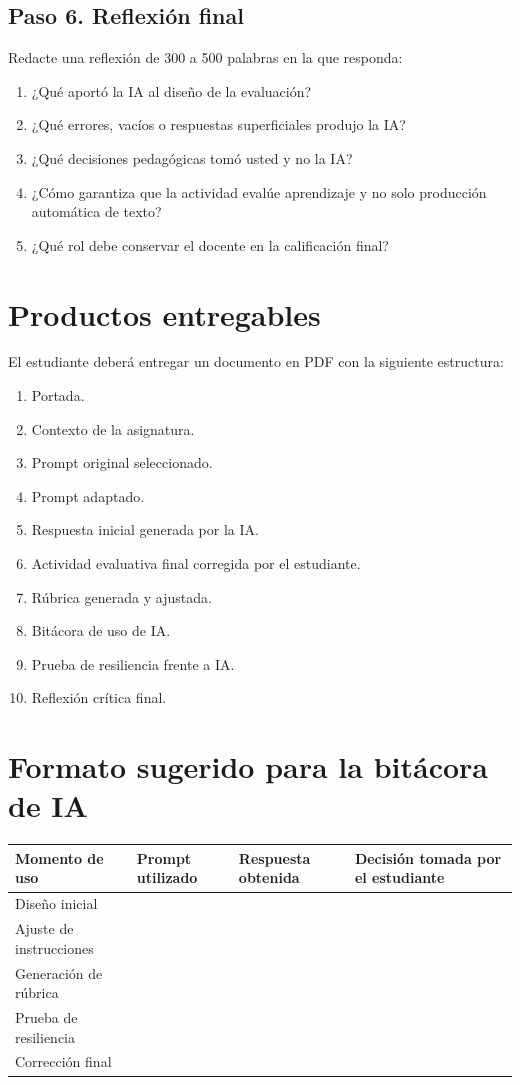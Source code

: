 \documentclass[12pt,letterpaper]{article}
\begin{document}
\subsection*{Paso 6. Reflexión final}

Redacte una reflexión de 300 a 500 palabras en la que responda:

\begin{enumerate}
  \item ¿Qué aportó la IA al diseño de la evaluación?
  \item ¿Qué errores, vacíos o respuestas superficiales produjo la IA?
  \item ¿Qué decisiones pedagógicas tomó usted y no la IA?
  \item ¿Cómo garantiza que la actividad evalúe aprendizaje y no solo
    producción automática de texto?
  \item ¿Qué rol debe conservar el docente en la calificación final?
\end{enumerate}

\section{Productos entregables}

El estudiante deberá entregar un documento en PDF con la siguiente estructura:

\begin{enumerate}
  \item Portada.
  \item Contexto de la asignatura.
  \item Prompt original seleccionado.
  \item Prompt adaptado.
  \item Respuesta inicial generada por la IA.
  \item Actividad evaluativa final corregida por el estudiante.
  \item Rúbrica generada y ajustada.
  \item Bitácora de uso de IA.
  \item Prueba de resiliencia frente a IA.
  \item Reflexión crítica final.
\end{enumerate}

\section{Formato sugerido para la bitácora de IA}

\begin{longtable}{p{3cm} p{4cm} p{4cm} p{4cm}}
  \toprule
  \textbf{Momento de uso} & \textbf{Prompt utilizado} &
  \textbf{Respuesta obtenida} & \textbf{Decisión tomada por el estudiante} \\
  \midrule
  Diseño inicial & & & \\
  \addlinespace
  Ajuste de instrucciones & & & \\
  \addlinespace
  Generación de rúbrica & & & \\
  \addlinespace
  Prueba de resiliencia & & & \\
  \addlinespace
  Corrección final & & & \\
  \bottomrule
\end{longtable}
\end{document}
